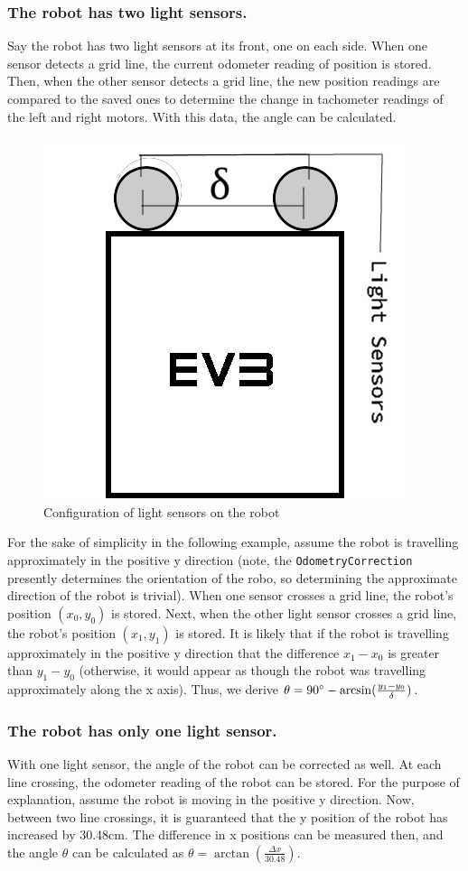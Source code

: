 \documentclass[11pt]{article} %
\begin{document}
\subsubsection{The robot has two light sensors.}
Say the robot has two light sensors at its front, one on each side. When one sensor detects a grid
line, the current odometer reading of position is stored. Then, when the other sensor
detects a grid line, the new position readings are compared to the saved ones to determine the
change in tachometer readings of the left and right motors. With this data, the angle can be
calculated.
\begin{figure}[h]
	\begin{center}
		\caption{Configuration of light sensors on the robot}
		\includegraphics[scale=0.5]{2SensorDiagram}
	\end{center}
\end{figure}
For the sake of simplicity in the following example, assume the robot is travelling approximately in the positive y direction (note, the \texttt{OdometryCorrection} presently determines the orientation of the
robo, so determining the approximate direction of the robot is trivial). When one sensor crosses a
grid line, the robot's position $(x_0,y_0)$ is stored. Next, when the other light sensor crosses a
grid line, the robot's position $(x_1,y_1)$ is stored. It is likely that if the robot is travelling
approximately in the positive y direction that the difference $x_1 - x_0$ is greater than $y_1 -
y_0$ (otherwise, it would appear as though the robot was travelling approximately along the x axis).
Thus, we derive $\theta = 90 \degree - \arcsin (\frac{y_1 - y_0}{\delta})$.
\subsubsection{The robot has only one light sensor.}
With one light sensor, the angle of the robot can be corrected as well. At each line crossing, the
odometer reading of the robot can be stored. For the purpose of explanation, assume the robot is
moving in the positive y direction. Now, between two line crossings, it is guaranteed that the y
position of the robot has increased by 30.48cm. The difference in x positions can be measured then,
and the angle $\theta$ can be calculated as $\theta = \arctan{(\frac{\Delta x}{30.48})}$.
\end{document}
